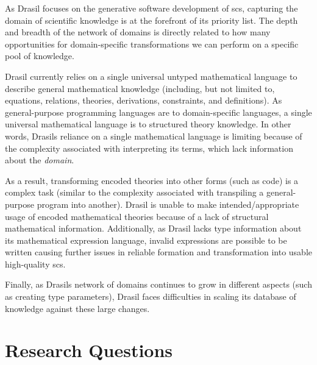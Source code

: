 As Drasil focuses on the generative software development of \acs{scs}, capturing
the domain of scientific knowledge is at the forefront of its priority list. The
depth and breadth of the network of domains is directly related to how many
opportunities for domain-specific transformations we can perform on a specific
pool of knowledge.

Drasil currently relies on a single universal untyped mathematical language to
describe general mathematical knowledge (including, but not limited to,
equations, relations, theories, derivations, constraints, and definitions). As
general-purpose programming languages are to domain-specific languages, a single
universal mathematical language is to structured theory knowledge. In other
words, Drasils reliance on a single mathematical language is limiting because of
the complexity associated with interpreting its terms, which lack information
about the \textit{domain}.

As a result, transforming encoded theories into other forms (such as code) is a
complex task (similar to the complexity associated with transpiling a
general-purpose program into another). Drasil is
unable to make intended/appropriate usage of encoded mathematical theories
because of a lack of structural mathematical information. Additionally, as
Drasil lacks type information about its mathematical expression language,
invalid expressions are possible to be written causing further issues in
reliable formation and transformation into usable high-quality \acs{scs}.

Finally, as Drasils network of domains continues to grow in different aspects
(such as creating type parameters), Drasil faces difficulties in scaling its
database of knowledge against these large changes.

\section{Research Questions}
\label{sec:intro:researchquestions}


